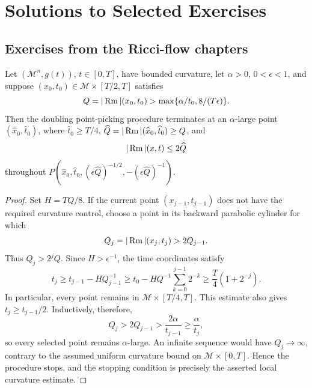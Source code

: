 \chapter{Solutions to Selected Exercises}
\label{app:chow-iii-selected-exercise-solutions}

\section{Exercises from the Ricci-flow chapters}

\begin{proposition}
\label{prop:chow-iii-appj-solution-22-2}
Let \((\mathcal M^n,g(t))\), \(t\in[0,T]\), have bounded curvature, let
\(\alpha>0\), \(0<\epsilon<1\), and suppose
\((x_0,t_0)\in\mathcal M\times[T/2,T]\) satisfies
\[
 Q=|\operatorname{Rm}|(x_0,t_0)>\max\{\alpha/t_0,8/(T\epsilon)\}.
\]
Then the doubling point-picking procedure terminates at an
\(\alpha\)-large point \((\widehat x_0,\widehat t_0)\), where
\(\widehat t_0\geq T/4\), \(\widehat Q=|\operatorname{Rm}|(\widehat x_0,\widehat t_0)\geq Q\),
and
\[
 |\operatorname{Rm}|(x,t)\leq2\widehat Q
\]
throughout
\(P(\widehat x_0,\widehat t_0,
(\epsilon\widehat Q)^{-1/2},-(\epsilon\widehat Q)^{-1})\).
\end{proposition}
\begin{proof}
Set \(H=TQ/8\).  If the current point \((x_{j-1},t_{j-1})\) does not
have the required curvature control, choose a point in its backward
parabolic cylinder for which
\[
 Q_j=|\operatorname{Rm}|(x_j,t_j)>2Q_{j-1}.
\]
Thus \(Q_j>2^jQ\).  Since \(H>\epsilon^{-1}\), the time coordinates satisfy
\[
 t_j\geq t_{j-1}-HQ_{j-1}^{-1}
 \geq t_0-HQ^{-1}\sum_{k=0}^{j-1}2^{-k}
 \geq \frac T4(1+2^{-j}).
\]
In particular, every point remains in \(\mathcal M\times[T/4,T]\).  This
estimate also gives \(t_j\geq t_{j-1}/2\).  Inductively, therefore,
\[
 Q_j>2Q_{j-1}>\frac{2\alpha}{t_{j-1}}
 \geq\frac{\alpha}{t_j},
\]
so every selected point remains \(\alpha\)-large.  An infinite sequence would
have \(Q_j\to\infty\), contrary to the assumed uniform curvature bound on
\(\mathcal M\times[0,T]\).  Hence the procedure stops, and the stopping
condition is precisely the asserted local curvature estimate.
\end{proof}

